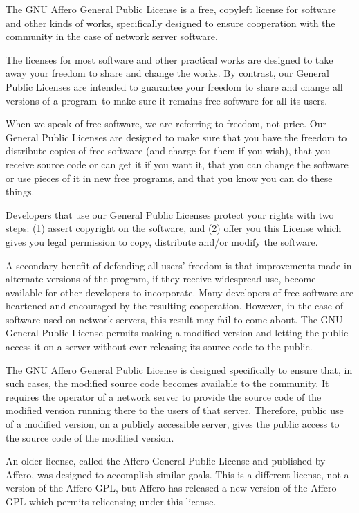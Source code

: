 \documentclass{article}%
\begin{document}
The GNU Affero General Public License is a free, copyleft license
for software and other kinds of works, specifically designed to ensure
cooperation with the community in the case of network server software.

The licenses for most software and other practical works are
designed to take away your freedom to share and change the works.        By
contrast, our General Public Licenses are intended to guarantee your
freedom to share and change all versions of a program--to make sure it
remains free software for all its users.

When we speak of free software, we are referring to freedom, not
price.  Our General Public Licenses are designed to make sure that you
have the freedom to distribute copies of free software (and charge for
them if you wish), that you receive source code or can get it if you
want it, that you can change the software or use pieces of it in new
free programs, and that you know you can do these things.

Developers that use our General Public Licenses protect your rights
with two steps: (1) assert copyright on the software, and (2) offer
you this License which gives you legal permission to copy, distribute
and/or modify the software.

A secondary benefit of defending all users' freedom is that
improvements made in alternate versions of the program, if they
receive widespread use, become available for other developers to
incorporate.    Many developers of free software are heartened and
encouraged by the resulting cooperation.        However, in the case of
software used on network servers, this result may fail to come about.
The GNU General Public License permits making a modified version and
letting the public access it on a server without ever releasing its
source code to the public.

The GNU Affero General Public License is designed specifically to
ensure that, in such cases, the modified source code becomes available
to the community.        It requires the operator of a network server to
provide the source code of the modified version running there to the
users of that server.    Therefore, public use of a modified version, on
a publicly accessible server, gives the public access to the source
code of the modified version.

An older license, called the Affero General Public License and
published by Affero, was designed to accomplish similar goals.  This is
a different license, not a version of the Affero GPL, but Affero has
released a new version of the Affero GPL which permits relicensing under
this license.
\end{document}
